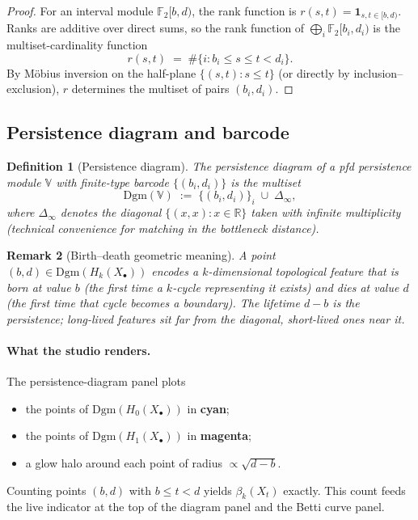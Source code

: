 \documentclass[11pt]{article}
\theoremstyle{persdef}
\newtheorem{definition}{Definition}[section]
\newtheorem{remark}[definition]{Remark}
\newcommand{\R}{\mathbb{R}}
\newcommand{\F}{\mathbb{F}}
\newcommand{\Ftwo}{\F_2}
\newcommand{\X}{X}
\newcommand{\PD}{\mathrm{Dgm}}
\newcommand{\Hk}[1]{H_{#1}}
\begin{document}
\begin{proof}
For an interval module $\Ftwo[b,d)$, the rank function is $r(s,t) = \mathbf{1}_{s,t\in[b,d)}$. Ranks are additive over direct sums, so the rank function of $\bigoplus_i\Ftwo[b_i,d_i)$ is the multiset-cardinality function
\[
r(s,t) \;=\; \#\{i : b_i\leq s\leq t < d_i\}.
\]
By M\"obius inversion on the half-plane $\{(s,t):s\leq t\}$ (or directly by inclusion--exclusion), $r$ determines the multiset of pairs $(b_i,d_i)$.
\end{proof}

\subsection{Persistence diagram and barcode}

\begin{definition}[Persistence diagram]\label{def:dgm}
The \emph{persistence diagram} of a pfd persistence module $\mathbb{V}$ with finite-type barcode $\{(b_i,d_i)\}$ is the multiset
\[
\PD(\mathbb{V}) \;:=\; \bigl\{(b_i,d_i)\bigr\}_{i} \;\cup\; \Delta_\infty,
\]
where $\Delta_\infty$ denotes the diagonal $\{(x,x):x\in\R\}$ taken with infinite multiplicity (technical convenience for matching in the bottleneck distance).
\end{definition}

\begin{remark}[Birth--death geometric meaning]\label{rem:bd}
A point $(b,d)\in\PD(\Hk{k}(\X_\bullet))$ encodes a $k$-dimensional topological feature that is born at value $b$ (the first time a $k$-cycle representing it exists) and dies at value $d$ (the first time that cycle becomes a boundary). The \emph{lifetime} $d-b$ is the \emph{persistence}; long-lived features sit far from the diagonal, short-lived ones near it.
\end{remark}

\paragraph{What the studio renders.} The persistence-diagram panel plots
\begin{itemize}[leftmargin=2em,itemsep=0.2em]
  \item the points of $\PD(\Hk{0}(\X_\bullet))$ in {\color{accentH0}\textbf{cyan}};
  \item the points of $\PD(\Hk{1}(\X_\bullet))$ in {\color{accentH1}\textbf{magenta}};
  \item a glow halo around each point of radius $\propto \sqrt{d-b}$.
\end{itemize}
Counting points $(b,d)$ with $b\leq t < d$ yields $\beta_k(\X_t)$ exactly. This count feeds the live indicator at the top of the diagram panel and the Betti curve panel.
\end{document}
